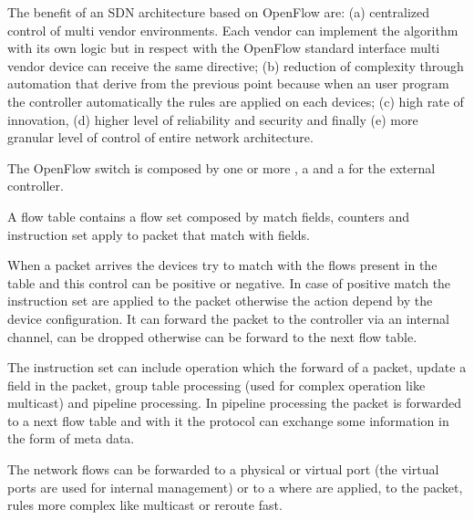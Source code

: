 The benefit of an \ac{SDN} architecture based on OpenFlow are: (a) centralized control of multi vendor environments. Each vendor can implement the algorithm with its own logic but in respect with the OpenFlow standard interface multi vendor device can receive the same directive; (b) reduction of complexity through automation that derive from the previous point because when an user program the controller automatically the rules are applied on each devices; (c) high rate of innovation, (d) higher level of reliability and security and finally (e) more granular level of control of entire network architecture.

The OpenFlow switch is composed by one or more , a  and a  for the external controller.

A flow table contains a flow set composed by match fields, counters and instruction set apply to packet that match with fields.

When a packet arrives the devices try to match with the flows present in the table and this control can be positive or negative. In case of positive match the instruction set are applied to the packet otherwise the action depend by the device configuration. It can forward the packet to the controller via an internal channel, can be dropped otherwise can be forward to the next flow table.

The instruction set can include operation which the forward of a packet, update a field in the packet, group table processing (used for complex operation like multicast) and pipeline processing. In pipeline processing the packet is forwarded to a next flow table and with it the protocol can exchange some information in the form of meta data.

The network flows can be forwarded to a physical or virtual port (the virtual ports are used for internal management) or to a  where are applied, to the packet, rules more complex like multicast or reroute fast.
